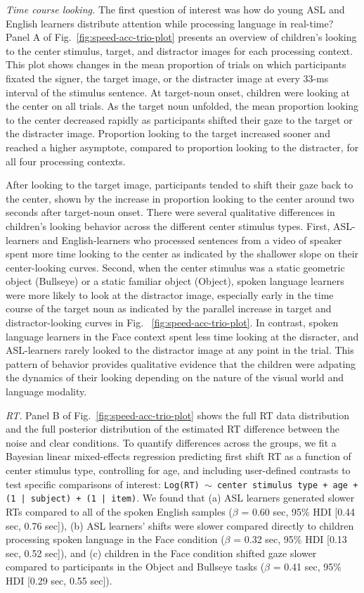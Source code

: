 \documentclass[english,floatsintext,man]{apa6}
\begin{document}
\emph{Time course looking.} The first question of interest was how do
young ASL and English learners distribute attention while processing
language in real-time? Panel A of Fig.~\ref{fig:speed-acc-trio-plot}
presents an overview of children's looking to the center stimulus,
target, and distractor images for each processing context. This plot
shows changes in the mean proportion of trials on which participants
fixated the signer, the target image, or the distracter image at every
33-ms interval of the stimulus sentence. At target-noun onset, children
were looking at the center on all trials. As the target noun unfolded,
the mean proportion looking to the center decreased rapidly as
participants shifted their gaze to the target or the distracter image.
Proportion looking to the target increased sooner and reached a higher
asymptote, compared to proportion looking to the distracter, for all
four processing contexts.

After looking to the target image, participants tended to shift their
gaze back to the center, shown by the increase in proportion looking to
the center around two seconds after target-noun onset. There were
several qualitative differences in children's looking behavior across
the different center stimulus types. First, ASL-learners and
English-learners who processed sentences from a video of speaker spent
more time looking to the center as indicated by the shallower slope on
their center-looking curves. Second, when the center stimulus was a
static geometric object (Bullseye) or a static familiar object (Object),
spoken language learners were more likely to look at the distractor
image, especially early in the time course of the target noun as
indicated by the parallel increase in target and distractor-looking
curves in Fig. ~\ref{fig:speed-acc-trio-plot}. In contrast, spoken
language learners in the Face context spent less time looking at the
disracter, and ASL-learners rarely looked to the distractor image at any
point in the trial. This pattern of behavior provides qualitative
evidence that the children were adpating the dynamics of their looking
depending on the nature of the visual world and language modality.

\emph{RT.} Panel B of Fig.~\ref{fig:speed-acc-trio-plot} shows the full
RT data distribution and the full posterior distribution of the
estimated RT difference between the noise and clear conditions. To
quantify differences across the groups, we fit a Bayesian linear
mixed-effects regression predicting first shift RT as a function of
center stimulus type, controlling for age, and including user-defined
contrasts to test specific comparisons of interest:
\texttt{Log(RT) $\sim$ center stimulus type + age +  (1 | subject) + (1 | item)}.
We found that (a) ASL learners generated slower RTs compared to all of
the spoken English samples (\(\beta\) = 0.60 sec, 95\% HDI {[}0.44 sec,
0.76 sec{]}), (b) ASL learners' shifts were slower compared directly to
children processing spoken language in the Face condition (\(\beta\) =
0.32 sec, 95\% HDI {[}0.13 sec, 0.52 sec{]}), and (c) children in the
Face condition shifted gaze slower compared to participants in the
Object and Bullseye tasks (\(\beta\) = 0.41 sec, 95\% HDI {[}0.29 sec,
0.55 sec{]}).
\end{document}
